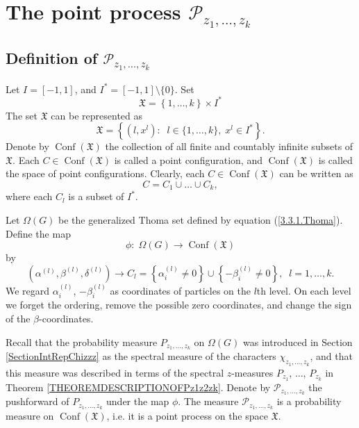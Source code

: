 \documentclass[12pt]{amsart}
\theoremstyle{definition}
\numberwithin{equation}{section}
\DeclareMathOperator{\Conf}{Conf}
\begin{document}
\section{The point process $\mathcal{P}_{z_1,\ldots,z_k}$}\label{SectionPointProcess11}
\subsection{Definition of $\mathcal{P}_{z_1,\ldots,z_k}$}
Let $I=[-1,1]$, and $I^*=[-1,1]\setminus\{0\}$. Set
$$
\mathfrak{X}=\left\{1,\ldots,k\right\}\times I^{\ast}
$$
The set $\mathfrak{X}$ can be represented as
$$
\mathfrak{X}=\left\{\left(l,x^l\right):\;\;l\in \{1,\ldots,k\},\; x^l\in I^{\ast}\right\}.
$$
Denote by $\Conf\left(\mathfrak{X}\right)$ the collection of all finite and countably infinite subsets of $\mathfrak{X}$. Each $C\in\Conf\left(\mathfrak{X}\right)$ is called a point configuration, and
$\Conf\left(\mathfrak{X}\right)$ is called the space of point configurations.
Clearly, each $C\in\Conf\left(\mathfrak{X}\right)$ can be written as
$$
C=C_1\cup\ldots\cup C_k,
$$
where each $C_l$ is a subset of $I^{\ast}$.

Let $\Omega\left(G\right)$ be the generalized Thoma set defined by equation
(\ref{3.3.1.Thoma}). Define the map
$$
\phi:\; \Omega\left(G\right)\longrightarrow\Conf\left(\mathfrak{X}\right)
$$
by
$$
\left(\alpha^{(l)},\beta^{(l)},\delta^{(l)}\right)\rightarrow
C_l=\left\{\alpha_i^{(l)}\neq 0\right\}\cup\left\{-\beta_i^{(l)}\neq 0\right\},\;\; l=1,\ldots,k.
$$
We regard $\alpha_i^{(l)}$, $-\beta_i^{(l)}$ as coordinates of particles on the $l$th level. On each level we forget the ordering, remove the possible zero coordinates, and change the sign of the $\beta$-coordinates.

Recall that the probability measure $P_{z_1,\ldots,z_k}$ on $\Omega\left(G\right)$ was introduced in Section \ref{SectionIntRepChizzz} as the spectral measure of the characters $\chi_{z_1,\ldots,z_k}$, and that this measure was described in terms of the spectral $z$-measures $P_{z_1}$, $\ldots$, $P_{z_k}$ in Theorem \ref{THEOREMDESCRIPTIONOFPz1z2zk}. Denote by $\mathcal{P}_{z_1,\ldots,z_k}$ the pushforward of $P_{z_1,\ldots,z_k}$ under the map $\phi$. The measure $\mathcal{P}_{z_1,\ldots,z_k}$ is a probability measure on $\Conf\left(\mathfrak{X}\right)$, i.e. it is a point process on the space $\mathfrak{X}$.
\end{document}
